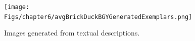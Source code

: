 \begin{figure}
\centering

\texttt{[image: Figs/chapter6/avgBrickDuckBGYGeneratedExemplars.png]}
\caption{Images generated from textual descriptions.}
\label{fig:mrl_teaser}
\end{figure}









